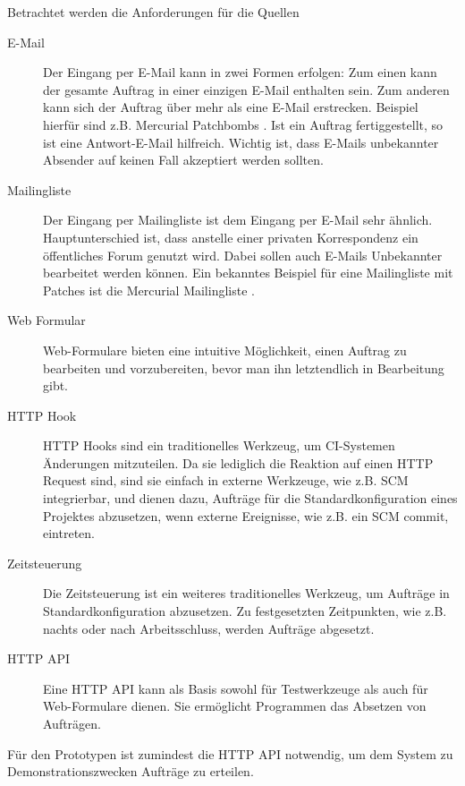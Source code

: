 Betrachtet werden die Anforderungen für die Quellen
\begin{description}
    \item[E-Mail]
        Der Eingang per E-Mail kann in zwei Formen erfolgen:
        Zum einen kann der gesamte Auftrag in einer einzigen E-Mail enthalten sein.
        Zum anderen kann sich der Auftrag über mehr als eine E-Mail erstrecken.
        Beispiel hierfür sind z.B. Mercurial Patchbombs \cite{mercurial:patchbomb}.
        Ist ein Auftrag fertiggestellt, so ist eine Antwort-E-Mail hilfreich.
        Wichtig ist, dass E-Mails unbekannter Absender auf keinen Fall
        akzeptiert werden sollten.
    \item[Mailingliste]
        Der Eingang per Mailingliste ist dem Eingang per E-Mail sehr ähnlich.
        Hauptunterschied ist, dass anstelle einer privaten Korrespondenz
        ein öffentliches Forum genutzt wird. Dabei sollen auch E-Mails Unbekannter 
        bearbeitet werden können.
        Ein bekanntes Beispiel für eine Mailingliste mit Patches
        ist die Mercurial Mailingliste \cite{mercurial:mailingliste}.
    \item[Web Formular]
        Web-Formulare bieten eine intuitive Möglichkeit,
        einen Auftrag zu bearbeiten und vorzubereiten,
        bevor man ihn letztendlich in Bearbeitung gibt.
    \item[HTTP Hook]
        HTTP Hooks sind ein traditionelles Werkzeug,
        um \ac{CI}-Systemen Änderungen mitzuteilen.
        Da sie lediglich die Reaktion auf einen HTTP Request sind,
        sind sie einfach in externe Werkzeuge, wie z.B. \ac{SCM} integrierbar,
        und dienen dazu, Aufträge für die Standardkonfiguration
        eines Projektes abzusetzen, wenn externe Ereignisse,
        wie z.B. ein SCM commit, eintreten.
    \item[Zeitsteuerung]
        Die Zeitsteuerung ist ein weiteres traditionelles Werkzeug,
        um Aufträge in Standardkonfiguration abzusetzen.
        Zu festgesetzten Zeitpunkten, wie z.B. nachts oder nach
        Arbeitsschluss, werden Aufträge abgesetzt.
    \item[HTTP API]
        Eine HTTP API kann als Basis sowohl für Testwerkzeuge
        als auch für Web-Formulare dienen.
        Sie ermöglicht Programmen das Absetzen von Aufträgen.
\end{description}

Für den Prototypen ist zumindest die HTTP API notwendig,
um dem System zu Demonstrationszwecken Aufträge zu erteilen.


